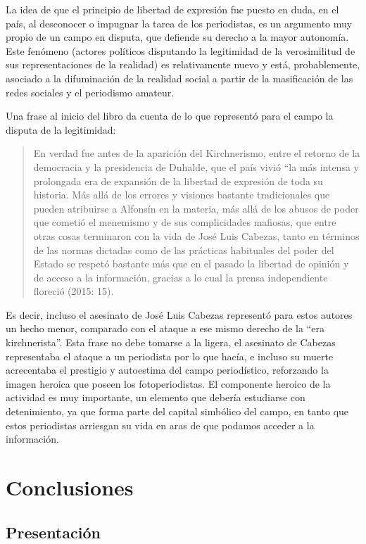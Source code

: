 La idea de que el principio de libertad de expresión fue puesto en duda, en el país, al desconocer o impugnar la tarea de los periodistas, es un argumento muy propio de un campo en disputa, que defiende su derecho a la mayor autonomía. Este fenómeno (actores políticos disputando la legitimidad de la verosimilitud de sus representaciones de la realidad) es relativamente nuevo y está, probablemente, asociado a la difuminación de la realidad social a partir de la masificación de las redes sociales y el periodismo amateur.

Una frase al inicio del libro da cuenta de lo que representó para el campo la disputa de la legitimidad:

\begin{quote}
En verdad fue antes de la aparición del Kirchnerismo, entre el retorno de la democracia y la presidencia de Duhalde, que el país vivió ``la más intensa y prolongada era de expansión de la libertad de expresión de toda su historia. Más allá de los errores y visiones bastante tradicionales que pueden atribuirse a Alfonsín en la materia, más allá de los abusos de poder que cometió el menemismo y de sus complicidades mafiosas, que entre otras cosas terminaron con la vida de José Luis Cabezas, tanto en términos de las normas dictadas como de las prácticas habituales del poder del Estado se respetó bastante más que en el pasado la libertad de opinión y de acceso a la información, gracias a lo cual la prensa independiente floreció (2015: 15).
\end{quote}

Es decir, incluso el asesinato de José Luis Cabezas representó para estos autores un hecho menor, comparado con el ataque a ese mismo derecho de la ``era kirchnerista''. Esta frase no debe tomarse a la ligera, el asesinato de Cabezas representaba el ataque a un periodista por lo que hacía, e incluso su muerte acrecentaba el prestigio y autoestima del campo periodístico, reforzando la imagen heroica que poseen los fotoperiodistas. El componente heroico de la actividad es muy importante, un elemento que debería estudiarse con detenimiento, ya que forma parte del capital simbólico del campo, en tanto que estos periodistas arriesgan su vida en aras de que podamos acceder a la información.

\chapter{Conclusiones}

\section{Presentación}


